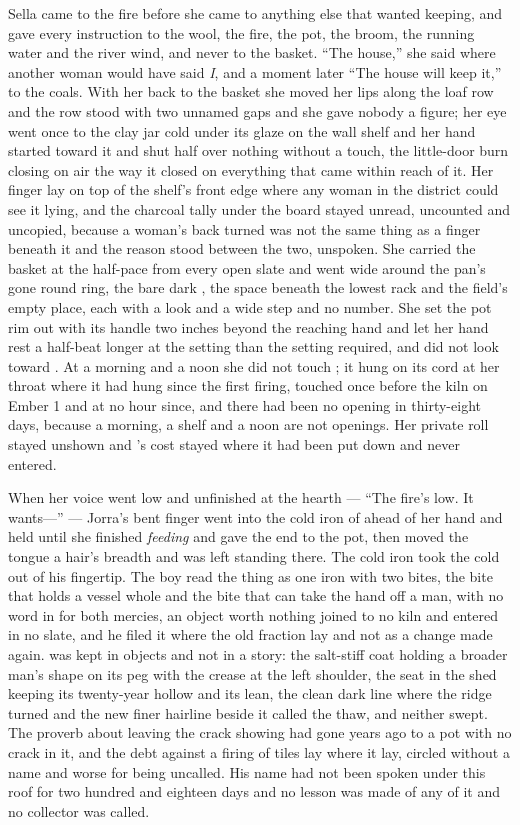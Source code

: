 Sella came to the fire before she came to anything else that wanted keeping, and gave every instruction to the wool, the fire, the pot, the broom, the running water and the river wind, and never to the basket. “The house,” she said where another woman would have said \emph{I}, and a moment later “The house will keep it,” to the coals. With her back to the basket she moved her lips along the loaf row and the row stood with two unnamed gaps and she gave nobody a figure; her eye went once to the clay jar cold under its glaze on the wall shelf and her hand started toward it and shut half over nothing without a touch, the little-door burn closing on air the way it closed on everything that came within reach of it. Her finger lay on top of the shelf's front edge where any woman in the district could see it lying, and the charcoal tally under the board stayed unread, uncounted and uncopied, because a woman's back turned was not the same thing as a finger beneath it and the reason stood between the two, unspoken. She carried the basket at the half-pace from every open slate and went wide around the pan's gone round ring, the bare dark , the space beneath the lowest rack and the field's empty place, each with a look and a wide step and no number. She set the pot rim out with its handle two inches beyond the reaching hand and let her hand rest a half-beat longer at the setting than the setting required, and did not look toward . At a morning and a noon she did not touch ; it hung on its cord at her throat where it had hung since the first firing, touched once before the kiln on Ember 1 and at no hour since, and there had been no opening in thirty-eight days, because a morning, a shelf and a noon are not openings. Her private roll stayed unshown and 's cost stayed where it had been put down and never entered.

When her voice went low and unfinished at the hearth --- “The fire's low. It wants---” --- Jorra's bent finger went into the cold iron of  ahead of her hand and held until she finished \emph{feeding} and gave the end to the pot, then moved the tongue a hair's breadth and was left standing there. The cold iron took the cold out of his fingertip. The boy read the thing as one iron with two bites, the bite that holds a vessel whole and the bite that can take the hand off a man, with no word in  for both mercies, an object worth nothing joined to no kiln and entered in no slate, and he filed it where the old fraction lay and not as a change made again.  was kept in objects and not in a story: the salt-stiff coat holding a broader man's shape on its peg with the crease at the left shoulder, the seat in the shed keeping its twenty-year hollow and its lean, the clean dark line where the  ridge turned and the new finer hairline beside it called the thaw, and neither swept. The proverb about leaving the crack showing had gone years ago to a pot with no crack in it, and the debt against a firing of tiles lay where it lay, circled without a name and worse for being uncalled. His name had not been spoken under this roof for two hundred and eighteen days and no lesson was made of any of it and no collector was called.

